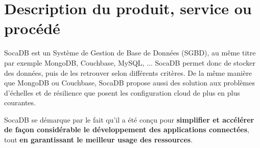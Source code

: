 \documentclass[a4paper,10pt]{scrreprt}
\begin{document}
    \section{Description du produit, service ou procédé}

        SocaDB est un Système de Gestion de Base de Données (SGBD), au même titre par exemple MongoDB, Couchbase, MySQL, ... SocaDB permet donc de stocker des données, puis de les retrouver selon différents critères. De la même manière que MongoDB ou Couchbase, SocaDB propose aussi des solution aux problèmes d'échelles et de résilience que posent les configuration cloud de plus en plus courantes.
        
        SocaDB se démarque par le fait qu'il a été conçu pour \textbf{simplifier et accélérer de façon considérable le développement des applications connectées}, tout \textbf{en garantissant le meilleur usage des ressources}.
        
                
        
    
    

        
\end{document}

